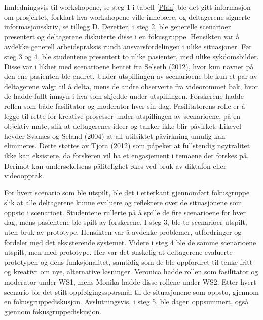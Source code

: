 \noindent
Innledningsvis til workshopene, se steg 1 i tabell \ref{Plan} ble det gitt informasjon om prosjektet, forklart hva workshopene ville innebære, og deltagerene signerte informasjonsskriv, se tillegg D. Deretter, i steg 2, ble generelle scenarioer presentert og deltagerene diskuterte disse i en fokusgruppe. Hensikten var å avdekke generell arbeidspraksis rundt ansvarsfordelingen i ulike situasjoner.
Før steg 3 og 4, ble studentene presentert to ulike pasienter, med ulike sykdomsbilder. Disse var i likhet med scenarioene hentet fra Selseth (2012), hvor kun navnet på den ene pasienten ble endret. Under utspillingen av scenarioene ble kun et par av deltagerene valgt til å delta, mens de andre observerte fra videorommet bak, hvor de hadde fullt innsyn i hva som skjedde under utspillingen. Forskerene hadde rollen som både fasilitator og moderator hver sin dag. Fasilitatorens rolle er å legge til rette for kreative prosesser under utspillingen av scenarioene, på en objektiv måte, slik at deltagerenes ideer og tanker ikke blir påvirket. Likevel hevder Svanæs og Seland (2004) at all utilsiktet påvirkning umulig kan elimineres. Dette støttes av Tjora (2012) som påpeker at fullstendig nøytralitet ikke kan eksistere, da forskeren vil ha et engasjement i temaene det forskes på. Derimot kan undersøkelsens pålitelighet økes ved bruk av diktafon eller videoopptak. 

\noindent
For hvert scenario som ble utspilt, ble det i etterkant gjennomført fokusgruppe slik at alle deltagerene kunne evaluere og  reflektere over de situasjonene som oppsto i scenarioet. Studentene rullerte på å spille de fire scenarioene for hver dag, mens pasientene ble spilt av forskerene. I steg 3, ble to scenarioer utspilt, uten bruk av prototype. Hensikten var å avdekke problemer, utfordringer og fordeler med det eksisterende systemet. Videre i steg 4 ble de samme scenarioene utspilt, men med prototype. Her var det ønskelig at deltagerene evaluerte prototypen og dens funksjonalitet, samtidig som de ble oppfordret til tenke fritt og kreativt om nye, alternative løsninger. Veronica hadde rollen som fasilitator og moderator under WS1, mens Monika hadde disse rollene under WS2. Etter hvert scenario ble det stilt oppfølgingsspørsmål til de situasjonene som oppsto, gjennom en fokusgruppediskusjon. Avslutningsvis, i steg 5, ble dagen oppsummert, også gjennom fokusgruppediskusjon. 

